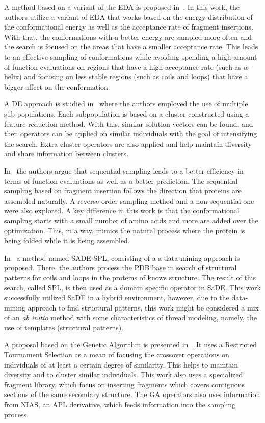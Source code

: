 A method based on a variant of the \ac{EDA} is proposed in~\cite{hao2017double}. In
this work, the authors utilize a variant of \ac{EDA} that works based on the energy
distribution of the conformational energy as well as the acceptance rate of fragment
insertions. With that, the conformations with a better energy are sampled more often
and the search is focused on the areas that have a smaller acceptance rate. This
leads to an effective sampling of conformations while avoiding spending a high
amount of function evaluations on regions that have a high acceptance rate (such
as $\alpha$-helix) and focusing on less stable regions (such as coils and loops)
that have a bigger affect on the conformation.


A \ac{DE} approach is studied in~\cite{hao2017conformational} where the authors
employed the use of multiple sub-populations. Each subpopulation is based on a cluster
constructed using a feature reduction method. With this, similar solution vectors
can be found, and then operators can be applied on similar individuals with the goal
of intensifying the search. Extra cluster operators are also applied and help
maintain diversity and share information between clusters.


In~\cite{de2017sequential} the authors argue that sequential sampling leads to a better
efficiency in terms of function evaluations as well as a better prediction. The sequential
sampling based on fragment insertion follows the direction that proteins are assembled
naturally. A reverse order sampling method and a non-sequential one were also explored.
A key difference in this work is that the conformational sampling starts with a small
number of amino acids and more are added over the optimization. This, in a way, mimics
the natural process where the protein is being folded while it is being assembled.


In~\cite{oliveira2017sade} a method named SADE-SPL, consisting of a a data-mining
approach is proposed. There, the authors process the PDB base in search of structural patterns
for coils and loops in the proteins of knows structure. The result of this search, called
SPL, is then used as a domain specific operator in \ac{SaDE}. This work successfully utilized
\ac{SaDE} in a hybrid environment, however, due to the data-mining approach to find structural
patterns, this work might be considered a mix of an \textit{ab initio} method with some
characteristics of thread modeling, namely, the use of templates (structural patterns).

A proposal based on the Genetic Algorithm is presented in~\cite{borguesan2018genetic}. It uses
a Restricted Tournament Selection as a mean of focusing the crossover operations on individuals
of at least a certain degree of similarity. This helps to maintain diversity and to cluster
similar individuals. This work also uses a specialized fragment library,
which focus on inserting fragments which covers contiguous sections of the same secondary structure.
The \ac{GA} operators also uses information from NIAS, an \ac{APL} derivative,
which feeds information into the sampling process.

